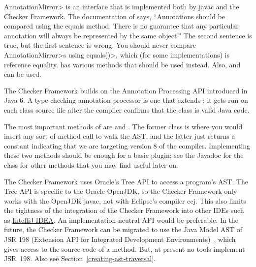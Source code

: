 
\<AnnotationMirror> is an interface that is implemented both by javac and
the Checker Framework. The documentation of
 says, ``Annotations should be
compared using the equals method. There is no guarantee that any particular
annotation will always be represented by the same object.''  The second
sentence is true, but the first sentence is wrong.  You should never
compare \<AnnotationMirror>s using \<equals()>, which (for some
implementations) is reference equality.
 has various
methods that should be used instead. Also,
 and
 can be used.



The Checker Framework builds on the Annotation Processing API
introduced in Java 6.  A type-checking annotation processor is one that extends
; it gets run on each class
source file after the compiler confirms that the class is valid Java code.

The most important methods of 
are  and . The former
class is where you would insert any sort of method call to walk the AST\@,
and the latter just returns a constant indicating that we are targeting
version 8 of the compiler. Implementing these two methods should be enough
for a basic plugin; see the Javadoc for the class for other methods that
you may find useful later on.

The Checker Framework uses Oracle's Tree API to access a program's AST\@.
The Tree API is specific to the Oracle OpenJDK, so the Checker Framework only
works with the OpenJDK javac, not with Eclipse's compiler ecj.
This also limits the tightness of
the integration of the Checker Framework into other IDEs such as \href{https://www.jetbrains.com/idea/}{IntelliJ IDEA}\@.
An implementation-neutral API would be preferable.
In the future, the Checker Framework
can be migrated to use the Java Model AST of JSR 198 (Extension API for
Integrated Development Environments)~\cite{JSR198}, which gives access to
the source code of a method.  But, at present no tools
implement JSR~198.  Also see Section~\ref{creating-ast-traversal}.



